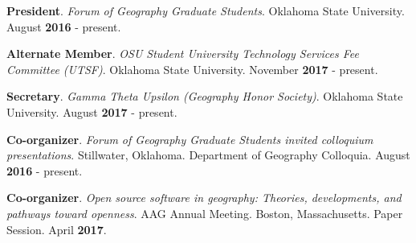 \begin{cventries}
  \cventry
    {}
    {}
    {}
    {}
    {
       \begin{cvitems}
          \vspace{-3mm}
        \item {\textbf{President}. \textit{Forum of Geography Graduate
              Students}. Oklahoma State University. August \textbf{2016} -
            present.} 
          \end{cvitems}
          }

  \cventry
    {}
    {}
    {}
    {}
    {
       \begin{cvitems}
          \vspace{-3mm}
        \item {\textbf{Alternate Member}. \textit{OSU Student University
              Technology Services Fee Committee (UTSF)}. Oklahoma State
            University. November \textbf{2017} - present.}
          \end{cvitems}
          }

  \cventry
    {}
    {}
    {}
    {}
    {
       \begin{cvitems}
          \vspace{-3mm}
        \item {\textbf{Secretary}. \textit{Gamma Theta Upsilon (Geography Honor
              Society)}. Oklahoma State University. August \textbf{2017} -
            present.}
          \end{cvitems}
          }

  \cventry
    {}
    {}
    {}
    {}
    {
       \begin{cvitems}
          \vspace{-3mm}
        \item {\textbf{Co-organizer}. \textit{Forum of Geography Graduate
              Students invited colloquium presentations}. Stillwater, Oklahoma.
            Department of Geography Colloquia. August \textbf{2016} - present.}
          \end{cvitems}
          }

  \cventry
    {}
    {}
    {}
    {}
    {
       \begin{cvitems}
          \vspace{-3mm}
        \item {\textbf{Co-organizer}. \textit{Open source software in geography:
              Theories, developments, and pathways toward openness}. AAG Annual
            Meeting. Boston, Massachusetts. Paper Session. April \textbf{2017}.}
          \end{cvitems}
          }


\end{cventries}
